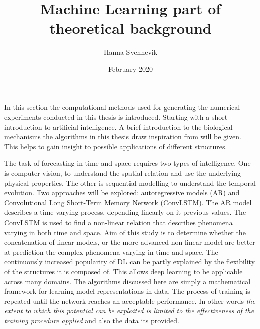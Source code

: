 \documentclass{article}
\title{Machine Learning part of theoretical background}
\author{Hanna Svennevik}
\date{February 2020}
\begin{document}
\maketitle
%
In this section the computational methods used for generating the numerical experiments conducted in this thesis is introduced. Starting with a short introduction to artificial intelligence. A brief introduction to the biological mechanisms the algorithms in this thesis draw inspiration from will be given. 
This helps to gain insight to possible applications of different structures. 

The task of forecasting in time and space requires two types of intelligence. One is computer vision, to understand the spatial relation and use the underlying physical properties. The other is sequential modelling to understand the temporal evolution. Two approaches will be explored: autoregressive models (AR) and Convolutional Long Short-Term Memory Network (ConvLSTM). The AR model describes a time varying process, depending linearly on it previous values. The ConvLSTM is used to find a non-linear relation that describes phenomena varying in both time and space. %
Aim of this study is to determine whether the concatenation of linear models, or the more advanced non-linear model are better at prediction the complex phenomena varying in time and space.
The continuously increased popularity of DL %
can be partly explained by the flexibility of the structures it is composed of. This allows deep learning to be applicable across many domains. The algorithms discussed here are simply a mathematical framework for learning model representations in data. The process of training is repeated until the network reaches an acceptable performance. In other words \textit{the extent to which this potential can be exploited is limited to the effectiveness of the training procedure applied} and also the data its provided. 
\end{document}
